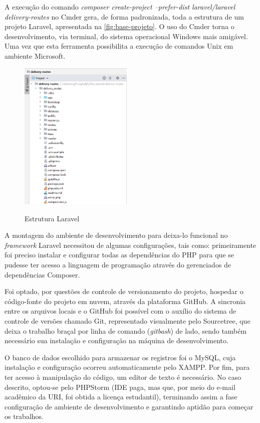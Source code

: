 A execução do comando \textit{composer create-project --prefer-dist laravel/laravel delivery-routes} no Cmder gera, de forma padronizada, toda a estrutura de um projeto Laravel, apresentada na \autoref{fig:base-projeto}. O uso do Cmder torna o desenvolvimento, via terminal, do sistema operacional Windows mais amigável. Uma vez que esta ferramenta possibilita a execução de comandos Unix em ambiente Microsoft.

\begin{figure}[H]
    \centering
    \caption{Estrutura Laravel}
    \includegraphics[width=0.48\textwidth]{./dados/figuras/fig6}
    \label{fig:base-projeto}
\end{figure}

A montagem do ambiente de desenvolvimento para deixa-lo funcional no \textit{framework} Laravel necessitou de algumas configurações, tais como: primeiramente foi preciso instalar e configurar todas as dependências do PHP para que se pudesse ter acesso a linguagem de programação através do gerenciados de dependências Composer.

Foi optado, por questões de controle de versionamento do projeto, hospedar o código-fonte do projeto em nuvem, através da plataforma GitHub. A sincronia entre os arquivos locais e o GitHub foi possível com o auxílio do sistema de controle de versões chamado Git, representado visualmente pelo Sourcetree, que deixa o trabalho braçal por linha de comando (\textit{gitbash}) de lado, sendo também necessário sua instalação e configuração na máquina de desenvolvimento. 

O banco de dados escolhido para armazenar os registros foi o MySQL, cuja instalação e configuração ocorreu automaticamente pelo XAMPP. Por fim, para ter acesso à manipulação do código, um editor de texto é necessário. No caso descrito, optou-se pelo PHPStorm (IDE paga, mas que, por meio do e-mail acadêmico da URI, foi obtida a licença estudantil), terminando assim a fase configuração de ambiente de desenvolvimento e garantindo aptidão para começar os trabalhos.

